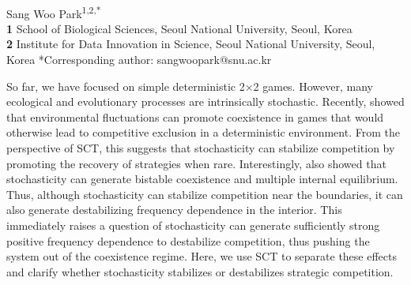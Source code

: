 \documentclass[12pt]{article}
\date{\today}
\begin{document}
\begin{flushleft}{
	\Large
	\textbf{}
}
\newline
\\
Sang Woo Park\textsuperscript{1,2,*}
\\
\bigskip
\textbf{1} School of Biological Sciences, Seoul National University, Seoul, Korea\\
\textbf{2} Institute for Data Innovation in Science, Seoul National University, Seoul, Korea
*Corresponding author: sangwoopark@snu.ac.kr
\end{flushleft}

So far, we have focused on simple deterministic 2×2 games. 
However, many ecological and evolutionary processes are intrinsically stochastic.
Recently, \cite{wang2025evolution} showed that environmental fluctuations can promote coexistence in games that would otherwise lead to competitive exclusion in a deterministic environment. 
From the perspective of SCT, this suggests that stochasticity can stabilize competition by promoting the recovery of strategies when rare. 
Interestingly, \cite{wang2025evolution} also showed that stochasticity can generate bistable coexistence and multiple internal equilibrium.
Thus, although stochasticity can stabilize competition near the boundaries, it can also generate destabilizing frequency dependence in the interior. 
This immediately raises a question of stochasticity can generate sufficiently strong positive frequency dependence to destabilize competition, thus pushing the system out of the coexistence regime.
Here, we use SCT to separate these effects and clarify whether stochasticity stabilizes or destabilizes strategic competition.
\end{document}
